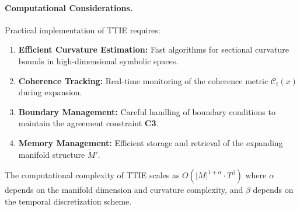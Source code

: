 \paragraph{Computational Considerations.}
Practical implementation of TTIE requires:
\begin{enumerate}
\item \textbf{Efficient Curvature Estimation:} Fast algorithms for sectional
curvature bounds in high-dimensional symbolic spaces.
\item \textbf{Coherence Tracking:} Real-time monitoring of the coherence metric $\mathcal{C}_t(x)$ during expansion.
\item \textbf{Boundary Management:} Careful handling of boundary conditions to maintain the agreement constraint \textbf{C3}.
\item \textbf{Memory Management:} Efficient storage and retrieval of the expanding manifold structure $\widetilde{M}'$.
\end{enumerate}

The computational complexity of TTIE scales as $O(|M|^{1+\alpha} \cdot T^{\beta})$ where $\alpha$ depends on the manifold dimension and curvature complexity, and $\beta$ depends on the temporal discretization scheme.

